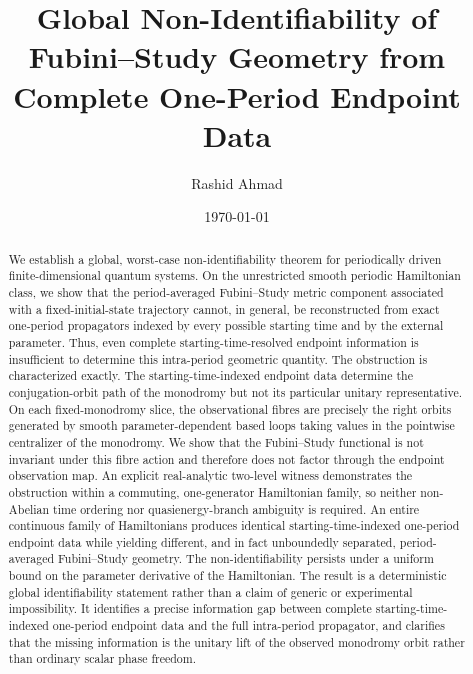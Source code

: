 \documentclass[twocolumn,prl,aps,floatfix]{revtex4-2}
\begin{document}
\title{Global Non-Identifiability of Fubini–Study Geometry from Complete One-Period Endpoint Data}
\author{Rashid Ahmad}
\date{\today}

\begin{abstract}
We establish a global, worst-case non-identifiability theorem for periodically driven finite-dimensional quantum systems. On the unrestricted smooth periodic Hamiltonian class, we show that the period-averaged Fubini--Study metric component associated with a fixed-initial-state trajectory cannot, in general, be reconstructed from exact one-period propagators indexed by every possible starting time and by the external parameter. Thus, even complete starting-time-resolved endpoint information is insufficient to determine this intra-period geometric quantity. The obstruction is characterized exactly. The starting-time-indexed endpoint data determine the conjugation-orbit path of the monodromy but not its particular unitary representative. On each fixed-monodromy slice, the observational fibres are precisely the right orbits generated by smooth parameter-dependent based loops taking values in the pointwise centralizer of the monodromy. We show that the Fubini--Study functional is not invariant under this fibre action and therefore does not factor through the endpoint observation map. An explicit real-analytic two-level witness demonstrates the obstruction within a commuting, one-generator Hamiltonian family, so neither non-Abelian time ordering nor quasienergy-branch ambiguity is required. An entire continuous family of Hamiltonians produces identical starting-time-indexed one-period endpoint data while yielding different, and in fact unboundedly separated, period-averaged Fubini--Study geometry. The non-identifiability persists under a uniform bound on the parameter derivative of the Hamiltonian. The result is a deterministic global identifiability statement rather than a claim of generic or experimental impossibility. It identifies a precise information gap between complete starting-time-indexed one-period endpoint data and the full intra-period propagator, and clarifies that the missing information is the unitary lift of the observed monodromy orbit rather than ordinary scalar phase freedom.
\end{abstract}


\maketitle
\end{document}
